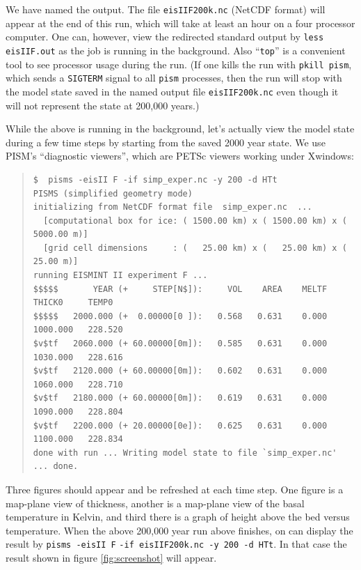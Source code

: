 \documentclass[11pt,final]{amsart}
\renewcommand{\t}[1]{\texttt{#1}}
\begin{document}
\noindent We have named the output.  The file \verb|eisIIF200k.nc| (NetCDF format) will appear at the end of this run, which will take at least an hour on a four processor computer.  One can, however, view the redirected standard output by \verb|less eisIIF.out| as the job is running in the background.  Also ``\t{top}'' is a convenient tool to see processor usage during the run.  (If one kills the run with \verb|pkill pism|, which sends a \verb|SIGTERM| signal to all \verb|pism| processes, then the run will stop with the model state saved in the named output file \verb|eisIIF200k.nc| even though it will not represent the state at 200,000 years.)

While the above is running in the background, let's actually view the model state during a few time steps by starting from the saved 2000 year state.  We use PISM's ``diagnostic viewers'', which are PETSc viewers working under Xwindows:

\small\begin{quote}\begin{verbatim}
$  pisms -eisII F -if simp_exper.nc -y 200 -d HTt
PISMS (simplified geometry mode)
initializing from NetCDF format file  simp_exper.nc  ...
  [computational box for ice: ( 1500.00 km) x ( 1500.00 km) x ( 5000.00 m)]
  [grid cell dimensions     : (   25.00 km) x (   25.00 km) x (   25.00 m)]
running EISMINT II experiment F ...
$$$$$       YEAR (+     STEP[N$]):     VOL    AREA    MELTF     THICK0     TEMP0
$$$$$   2000.000 (+  0.00000[0 ]):   0.568   0.631    0.000   1000.000   228.520
$v$tf   2060.000 (+ 60.00000[0m]):   0.585   0.631    0.000   1030.000   228.616
$v$tf   2120.000 (+ 60.00000[0m]):   0.602   0.631    0.000   1060.000   228.710
$v$tf   2180.000 (+ 60.00000[0m]):   0.619   0.631    0.000   1090.000   228.804
$v$tf   2200.000 (+ 20.00000[0e]):   0.625   0.631    0.000   1100.000   228.834
done with run ... Writing model state to file `simp_exper.nc' ... done.
\end{verbatim}
\end{quote}\normalsize

Three figures should appear and be refreshed at each time step.  One figure is a map-plane view of thickness, another is a map-plane view of the basal temperature in Kelvin, and third there is a graph of height above the bed versus temperature.  When the above 200,000 year run above finishes, on can display the result by \verb|pisms -eisII F| \verb|-if eisIIF200k.nc -y 200 -d HTt|.  In that case the result shown in figure \ref{fig:screenshot} will appear.
\medskip
\end{document}

